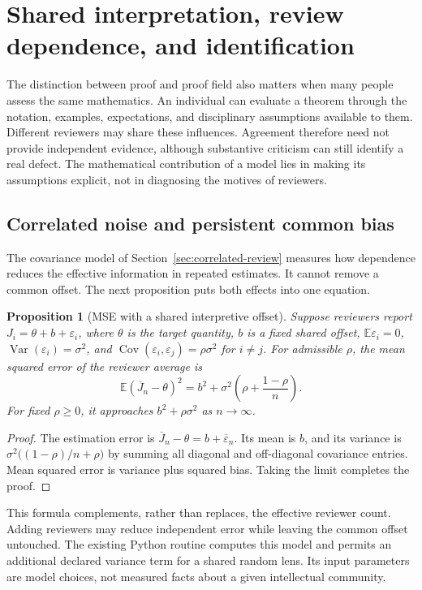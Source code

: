 \documentclass[11pt,oneside]{article}
\newtheorem{proposition}[theorem]{Proposition}
\theoremstyle{definition}
\theoremstyle{remark}
\begin{document}


\section{Shared interpretation, review dependence, and identification}
\label{sec:interpretation}

The distinction between proof and proof field also matters when many people assess the same mathematics. An individual can evaluate a theorem through the notation, examples, expectations, and disciplinary assumptions available to them. Different reviewers may share these influences. Agreement therefore need not provide independent evidence, although substantive criticism can still identify a real defect. The mathematical contribution of a model lies in making its assumptions explicit, not in diagnosing the motives of reviewers.

\subsection{Correlated noise and persistent common bias}

The covariance model of Section~\ref{sec:correlated-review} measures how dependence reduces the effective information in repeated estimates. It cannot remove a common offset. The next proposition puts both effects into one equation.

\begin{proposition}[MSE with a shared interpretive offset]
Suppose reviewers report $J_i=\theta+b+\varepsilon_i$, where $\theta$ is the target quantity, $b$ is a fixed shared offset, $\mathbb E\varepsilon_i=0$, $\operatorname{Var}(\varepsilon_i)=\sigma^2$, and $\operatorname{Cov}(\varepsilon_i,\varepsilon_j)=\rho\sigma^2$ for $i\ne j$. For admissible $\rho$, the mean squared error of the reviewer average is
\[
\boxed{\mathbb E(\overline J_n-\theta)^2=b^2+\sigma^2\left(\rho+\frac{1-\rho}{n}\right).}
\]
For fixed $\rho\ge0$, it approaches $b^2+\rho\sigma^2$ as $n\to\infty$.
\end{proposition}
\begin{proof}
The estimation error is $\overline J_n-\theta=b+\overline\varepsilon_n$. Its mean is $b$, and its variance is $\sigma^2\big((1-\rho)/n+\rho\big)$ by summing all diagonal and off-diagonal covariance entries. Mean squared error is variance plus squared bias. Taking the limit completes the proof.
\end{proof}

This formula complements, rather than replaces, the effective reviewer count. Adding reviewers may reduce independent error while leaving the common offset untouched. The existing Python routine  computes this model and permits an additional declared variance term for a shared random lens. Its input parameters are model choices, not measured facts about a given intellectual community.
\end{document}

